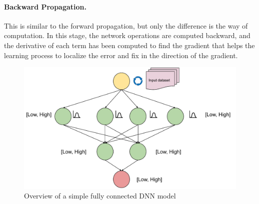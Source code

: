 \paragraph{Backward Propagation.} This is similar to the forward propagation, but only the difference is the way of computation. In this stage, the network operations are computed backward, and the derivative of each term has been computed to find the gradient that helps the learning process to localize the error and fix in the direction of the gradient.
\begin{figure}
	\includegraphics[width=0.8\linewidth]{overview}
	\centering
	\caption{Overview of a simple fully connected DNN model}
	\label{fig:rq5}
\end{figure}
